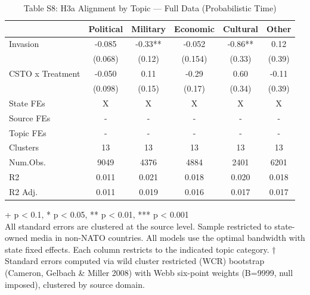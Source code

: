 \begin{table}[!t]
\caption{Table S8: H3a Alignment by Topic — Full Data (Probabilistic Time)} 
\fontsize{12.0pt}{14.4pt}\selectfont
\begin{tabular*}{\linewidth}{@{\extracolsep{\fill}}lccccc}
\toprule
  & Political & Military & Economic & Cultural & Other \\ 
\midrule\addlinespace[2.5pt]
Invasion & -0.085 & -0.33** & -0.052 & -0.86** & 0.12 \\ 
 & (0.068) & (0.12) & (0.154) & (0.33) & (0.39) \\ 
CSTO x Treatment & -0.050 & 0.11 & -0.29 & 0.60 & -0.11 \\ 
{} & {(0.098)} & {(0.15)} & {(0.17)} & {(0.34)} & {(0.39)} \\ 
State FEs & X & X & X & X & X \\ 
Source FEs & - & - & - & - & - \\ 
Topic FEs & - & - & - & - & - \\ 
Clusters & 13 & 13 & 13 & 13 & 13 \\ 
Num.Obs. & 9049 & 4376 & 4884 & 2401 & 6201 \\ 
R2 & 0.011 & 0.021 & 0.018 & 0.020 & 0.018 \\ 
R2 Adj. & 0.011 & 0.019 & 0.016 & 0.017 & 0.017 \\ 
\bottomrule
\end{tabular*}
\begin{minipage}{\linewidth}
+ p < 0.1, * p < 0.05, ** p < 0.01, *** p < 0.001\\
All standard errors are clustered at the source level. Sample restricted to
state-owned media in non-NATO countries. All models use the optimal bandwidth
with state fixed effects. Each column restricts to the indicated topic category.
† Standard errors computed via wild cluster restricted (WCR) bootstrap (Cameron,
Gelbach \& Miller 2008) with Webb six-point weights (B=9999, null imposed),
clustered by source domain.\\
\end{minipage}
\end{table}

